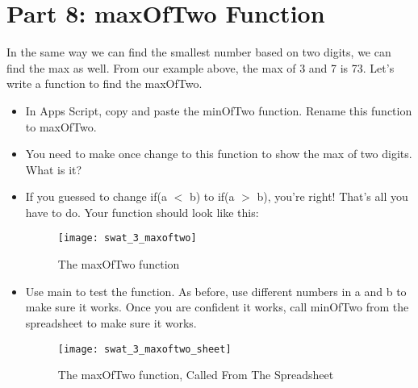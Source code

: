 \documentclass{article}
\begin{document}
\section*{Part 8: maxOfTwo Function}
In the same way we can find the smallest number based on two digits, we can find the max as well.  From our example above, the max of 3 and 7 is 73.  Let's write a function to find the maxOfTwo.
\begin{itemize}
	\item In Apps Script, copy and paste the minOfTwo function.  Rename this function to maxOfTwo.
	\item You need to make once change to this function to show the max of two digits.  What is it?
	\item If you guessed to change if(a $<$ b) to if(a $>$ b), you're right!  That's all you have to do.  Your function should look like this:
	\begin{figure}[H]
  		\centering
  		\texttt{[image: swat\_3\_maxoftwo]}
  		\caption{The maxOfTwo function}
	\end{figure}
	\item Use main to test the function.  As before, use different numbers in a and b to make sure it works.  Once you are confident it works, call minOfTwo from the spreadsheet to make sure it works.
	\begin{figure}[H]
  		\centering
  		\texttt{[image: swat\_3\_maxoftwo\_sheet]}
  		\caption{The maxOfTwo function, Called From The Spreadsheet}
	\end{figure}
\end{itemize}
\end{document}
